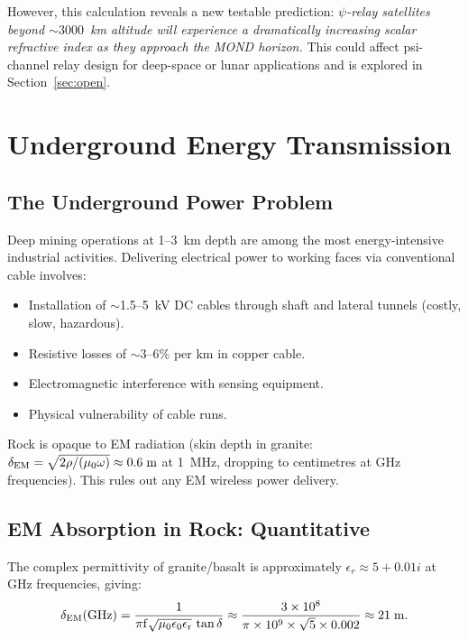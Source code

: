 \documentclass[aps,prd,twocolumn,superscriptaddress]{revtex4-2}
\begin{document}
However, this calculation reveals a new testable prediction:
\emph{$\psi$-relay satellites beyond $\sim 3000$~km altitude will
experience a dramatically increasing scalar refractive index as they
approach the MOND horizon.}  This could affect psi-channel relay
design for deep-space or lunar applications and is explored in
Section~\ref{sec:open}.

\section{Underground Energy Transmission}
\label{sec:underground}

\subsection{The Underground Power Problem}

Deep mining operations at 1--3~km depth are among the most energy-intensive
industrial activities.  Delivering electrical power to working faces via
conventional cable involves:
\begin{itemize}
\item Installation of $\sim$1.5--5~kV DC cables through shaft and
lateral tunnels (costly, slow, hazardous).
\item Resistive losses of $\sim$3--6\% per km in copper cable.
\item Electromagnetic interference with sensing equipment.
\item Physical vulnerability of cable runs.
\end{itemize}

Rock is opaque to EM radiation (skin depth in granite:
$\delta_{\rm EM} = \sqrt{2\rho/(\mu_0\omega)} \approx 0.6\;\si{m}$
at 1~MHz, dropping to centimetres at GHz frequencies).  This rules
out any EM wireless power delivery.

\subsection{EM Absorption in Rock: Quantitative}

The complex permittivity of granite/basalt is approximately
$\epsilon_r \approx 5 + 0.01i$ at GHz frequencies, giving:
\begin{equation}
\delta_{\rm EM}(\rm GHz) = \frac{1}{\pi f \sqrt{\mu_0\epsilon_0\epsilon_r}\,
\tan\delta}
\approx \frac{3\times10^8}{\pi\times10^9\times\sqrt{5}\times0.002}
\approx 21\;\si{m}.
\end{equation}
\end{document}
